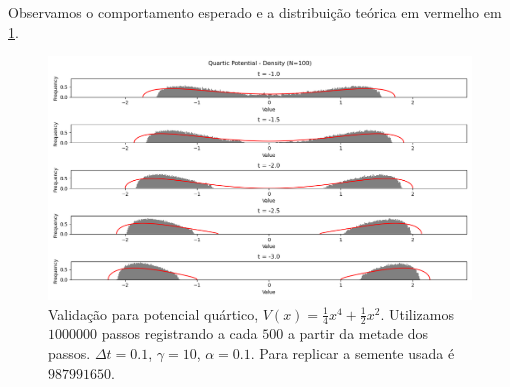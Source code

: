 Observamos o comportamento esperado e a distribuição teórica em vermelho em \ref{fig: quartic}. 


\begin{figure}[ht]
	\centering
		\includegraphics[scale=0.4]{Assets/validationArticleQuartic}
		\caption{Validação para potencial quártico, $V(x) = \frac{1}{4} x^4 + \frac{1}{2} x^2$. Utilizamos $1000000$ passos registrando a cada $500$ a partir da metade dos passos. $\Delta t = 0.1$, $\gamma = 10$, $\alpha = 0.1$. Para replicar a semente usada é $987991650$.}
		\label{fig: quartic}
\end{figure}

